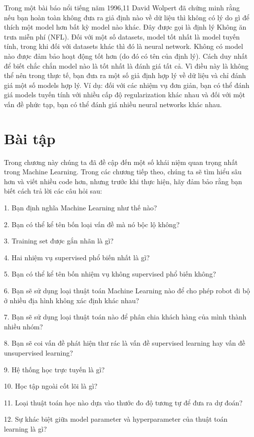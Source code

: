 Trong một bài báo nổi tiếng năm 1996,11 David Wolpert đã chứng minh rằng nếu bạn hoàn toàn không đưa ra giả định nào về dữ liệu thì không có lý do gì để thích một model hơn bất kỳ model nào khác. Đây được gọi là định lý Không ăn trưa miễn phí (NFL). Đối với một số datasets, model tốt nhất là model tuyến tính, trong khi đối với datasets khác thì đó là neural network. Không có model nào được đảm bảo hoạt động tốt hơn (do đó có tên của định lý). Cách duy nhất để biết chắc chắn model nào là tốt nhất là đánh giá tất cả. Vì điều này là không thể nên trong thực tế, bạn đưa ra một số giả định hợp lý về dữ liệu và chỉ đánh giá một số models hợp lý. Ví dụ: đối với các nhiệm vụ đơn giản, bạn có thể đánh giá models tuyến tính với nhiều cấp độ regularization khác nhau và đối với một vấn đề phức tạp, bạn có thể đánh giá nhiều neural networks khác nhau.

\section{Bài tập}

Trong chương này chúng ta đã đề cập đến một số khái niệm quan trọng nhất trong Machine Learning. Trong các chương tiếp theo, chúng ta sẽ tìm hiểu sâu hơn và viết nhiều code hơn, nhưng trước khi thực hiện, hãy đảm bảo rằng bạn biết cách trả lời các câu hỏi sau:

1. Bạn định nghĩa Machine Learning như thế nào?

2. Bạn có thể kể tên bốn loại vấn đề mà nó bộc lộ không?

3. Training set được gắn nhãn là gì?

4. Hai nhiệm vụ supervised phổ biến nhất là gì?

5. Bạn có thể kể tên bốn nhiệm vụ không supervised phổ biến không?

6. Bạn sẽ sử dụng loại thuật toán Machine Learning nào để cho phép robot đi bộ ở nhiều địa hình không xác định khác nhau?

7. Bạn sẽ sử dụng loại thuật toán nào để phân chia khách hàng của mình thành nhiều nhóm?

8. Bạn sẽ coi vấn đề phát hiện thư rác là vấn đề supervised learning hay vấn đề unsupervised learning?

9. Hệ thống học trực tuyến là gì?

10. Học tập ngoài cốt lõi là gì?

11. Loại thuật toán học nào dựa vào thước đo độ tương tự để đưa ra dự đoán?

12. Sự khác biệt giữa model parameter và hyperparameter của thuật toán learning là gì?


